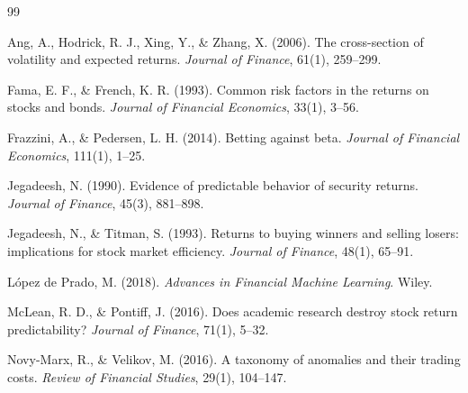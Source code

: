 \documentclass[11pt]{article}
\begin{document}
\begin{thebibliography}{99}

Ang, A., Hodrick, R. J., Xing, Y., \& Zhang, X. (2006).
The cross-section of volatility and expected returns.
\textit{Journal of Finance}, 61(1), 259--299.

Fama, E. F., \& French, K. R. (1993).
Common risk factors in the returns on stocks and bonds.
\textit{Journal of Financial Economics}, 33(1), 3--56.

Frazzini, A., \& Pedersen, L. H. (2014).
Betting against beta.
\textit{Journal of Financial Economics}, 111(1), 1--25.

Jegadeesh, N. (1990).
Evidence of predictable behavior of security returns.
\textit{Journal of Finance}, 45(3), 881--898.

Jegadeesh, N., \& Titman, S. (1993).
Returns to buying winners and selling losers: implications for stock market
efficiency.
\textit{Journal of Finance}, 48(1), 65--91.

L\'opez de Prado, M. (2018).
\textit{Advances in Financial Machine Learning}.
Wiley.

McLean, R. D., \& Pontiff, J. (2016).
Does academic research destroy stock return predictability?
\textit{Journal of Finance}, 71(1), 5--32.

Novy-Marx, R., \& Velikov, M. (2016).
A taxonomy of anomalies and their trading costs.
\textit{Review of Financial Studies}, 29(1), 104--147.

\end{thebibliography}
\end{document}
